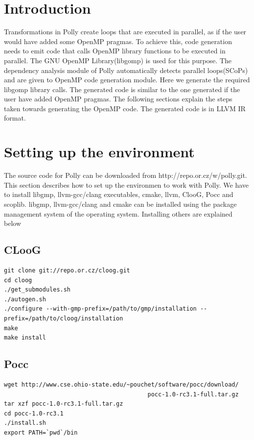 \label{chap:openmp}

\section{Introduction}
Transformations in Polly create loops that are executed in parallel, as if the user would have
added some OpenMP pragmas. To achieve this, code generation needs to emit code that calls OpenMP
library functions to be executed in parallel. The GNU OpenMP Library(libgomp) is used for this purpose. The
dependency analysis module of Polly automatically detects parallel loops(SCoPs) and are given to OpenMP
code generation module. Here we generate the required libgomp library calls. The generated code is similar
to the one generated if the user have added OpenMP pragmas\cite{parfor}. The following sections explain the steps
taken towards generating the OpenMP code. The generated code is in LLVM IR format.
\section{Setting up the environment}
The source code for Polly can be downloaded from http://repo.or.cz/w/polly.git. This section describes
how to set up the environmen to work with Polly. We have to install libgmp, llvm-gcc/clang executables,
cmake, llvm, ClooG, Pocc and scoplib. libgmp, llvm-gcc/clang and cmake can be installed using the package
management system of the operating system. Installing others are explained below

\subsection{CLooG}
\begin{verbatim}
git clone git://repo.or.cz/cloog.git
cd cloog
./get_submodules.sh
./autogen.sh
./configure --with-gmp-prefix=/path/to/gmp/installation --prefix=/path/to/cloog/installation
make
make install
\end{verbatim}

\subsection{Pocc}
\begin{verbatim}
wget http://www.cse.ohio-state.edu/~pouchet/software/pocc/download/
                                         pocc-1.0-rc3.1-full.tar.gz
tar xzf pocc-1.0-rc3.1-full.tar.gz
cd pocc-1.0-rc3.1
./install.sh
export PATH=`pwd`/bin
\end{verbatim}

